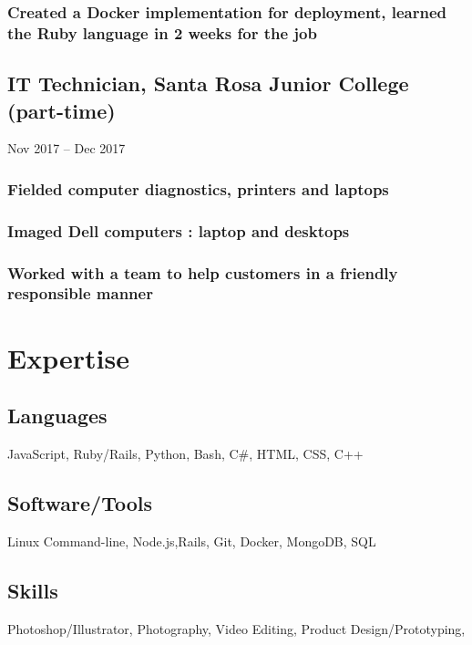 \documentclass{article}
\begin{document}
            \subsubsection{Created a Docker implementation for deployment, learned the Ruby language in 2 weeks for the job}
            
    \subsection{IT Technician, Santa Rosa Junior College (part-time)}Nov 2017 – Dec 2017
        
        \vspace{-2mm}
    	\subsubsection{Fielded computer diagnostics, printers and laptops }
    	\subsubsection{Imaged Dell computers : laptop and desktops }
    	\subsubsection{Worked with a team to help customers in a friendly responsible manner}

\section{Expertise}
		\subsection{Languages}
		JavaScript, Ruby/Rails, Python, Bash,  C\#, HTML, CSS, C++
		\vspace{-2mm}
		
		\subsection{Software/Tools}
		Linux Command-line, Node.js,Rails, Git, Docker, MongoDB, SQL
		\vspace{-3mm}
		\subsection{Skills}Photoshop/Illustrator, Photography, Video Editing, Product Design/Prototyping, 
		\vspace{-3mm}
\end{document}
